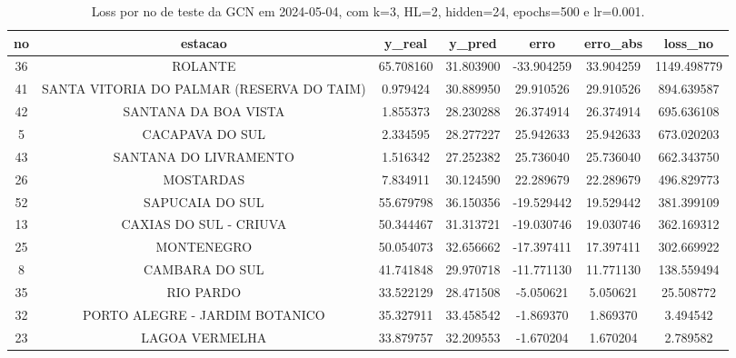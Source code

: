 \begin{table}[h]
\centering
\caption{Loss por no de teste da GCN em 2024-05-04, com k=3, HL=2, hidden=24, epochs=500 e lr=0.001.}
\label{tab:gcn_loss_k3_hl2_h24_e500_d20240504}
\begin{tabular}{ccccccc}
\toprule
no & estacao & y\_real & y\_pred & erro & erro\_abs & loss\_no \\
\midrule
36 & ROLANTE & 65.708160 & 31.803900 & -33.904259 & 33.904259 & 1149.498779 \\
41 & SANTA VITORIA DO PALMAR (RESERVA DO TAIM) & 0.979424 & 30.889950 & 29.910526 & 29.910526 & 894.639587 \\
42 & SANTANA DA BOA VISTA & 1.855373 & 28.230288 & 26.374914 & 26.374914 & 695.636108 \\
5 & CACAPAVA DO SUL & 2.334595 & 28.277227 & 25.942633 & 25.942633 & 673.020203 \\
43 & SANTANA DO LIVRAMENTO & 1.516342 & 27.252382 & 25.736040 & 25.736040 & 662.343750 \\
26 & MOSTARDAS & 7.834911 & 30.124590 & 22.289679 & 22.289679 & 496.829773 \\
52 & SAPUCAIA DO SUL & 55.679798 & 36.150356 & -19.529442 & 19.529442 & 381.399109 \\
13 & CAXIAS DO SUL - CRIUVA & 50.344467 & 31.313721 & -19.030746 & 19.030746 & 362.169312 \\
25 & MONTENEGRO & 50.054073 & 32.656662 & -17.397411 & 17.397411 & 302.669922 \\
8 & CAMBARA DO SUL & 41.741848 & 29.970718 & -11.771130 & 11.771130 & 138.559494 \\
35 & RIO PARDO & 33.522129 & 28.471508 & -5.050621 & 5.050621 & 25.508772 \\
32 & PORTO ALEGRE - JARDIM BOTANICO & 35.327911 & 33.458542 & -1.869370 & 1.869370 & 3.494542 \\
23 & LAGOA VERMELHA & 33.879757 & 32.209553 & -1.670204 & 1.670204 & 2.789582 \\
\bottomrule
\end{tabular}
\end{table}

